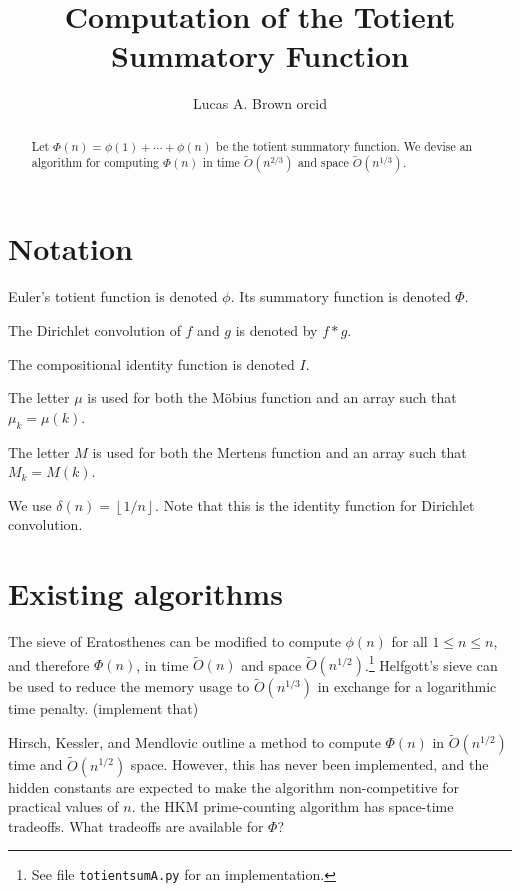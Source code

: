 \documentclass[12pt]{article}
\title{Computation of the Totient Summatory Function}
\author{Lucas A. Brown \todo orcid}
\date{\currentdatetime}
\newcommand{\floor}[1]{{\left\lfloor #1 \right\rfloor}}
\newcommand{\softO}[0]{\widetilde{O}}
\begin{document}
\maketitle %

\begin{abstract}
Let $\Phi(n) = \phi(1) + \cdots + \phi(n)$ be the totient summatory function.  We devise an algorithm for computing $\Phi(n)$ in time $\softO(n^{2/3})$ and space $\softO(n^{1/3})$.
\end{abstract}

\section{Notation}

Euler's totient function is denoted $\phi$.  Its summatory function is denoted $\Phi$.

The Dirichlet convolution of $f$ and $g$ is denoted by $f*g$.

The compositional identity function is denoted $I$.

The letter $\mu$ is used for both the M\"{o}bius function and an array such that $\mu_k = \mu(k)$.

The letter $M$ is used for both the Mertens function and an array such that $M_k = M(k)$.

We use $\delta(n) = \floor{1/n}$.  Note that this is the identity function for Dirichlet convolution.

\section{Existing algorithms}

The sieve of Eratosthenes can be modified to compute $\phi(n)$ for all $1 \leq n \leq n$, and therefore $\Phi(n)$, in time $\softO(n)$ and space $\softO(n^{1/2})$.\footnote{See file \texttt{totientsumA.py} for an implementation.}  Helfgott's sieve \cite{Helfgott2020} can be used to reduce the memory usage to $\softO(n^{1/3})$ in exchange for a logarithmic time penalty.  (\todo implement that)

Hirsch, Kessler, and Mendlovic outline \cite[\S5.6]{HKM2024} a method to compute $\Phi(n)$ in $\softO(n^{1/2})$ time and $\softO(n^{1/2})$ space.  However, this has never been implemented, and the hidden constants are expected to make the algorithm non-competitive for practical values of $n$.  \todo the HKM prime-counting algorithm has space-time tradeoffs.  What tradeoffs are available for $\Phi$?
\end{document}

